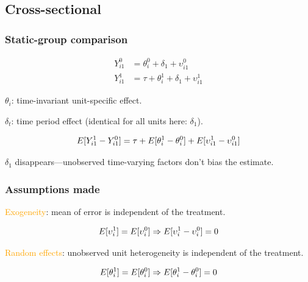 \documentclass[11pt,english,dvipsnames,aspectratio=169,handout]{beamer}\usepackage[]{graphicx}\usepackage[]{xcolor}
\begin{document}
\subsection{Cross-sectional}
\begin{frame}
  \frametitle{Static-group comparison}
  
  \begin{align*}
  Y_{i1}^0 &= \theta_{i}^0 + \delta_1 + \upsilon_{i1}^0\\
  Y_{i1}^1 &= \tau + \theta_{i}^1 + \delta_1 + \upsilon_{i1}^1
\end{align*}
  
  $\theta_i$: time-invariant unit-specific effect.
  
  $\delta_t$: time period effect (identical for all units here: $\delta_1$).
  \pause
  
  \begin{equation}
    \centering
    E[Y_{i1}^1 - Y_{i1}^0] = \tau + E[\theta_{i}^1 - \theta_{i}^0] + E[\upsilon_{i1}^1 - \upsilon_{i1}^0]
  \end{equation}
  
  $\delta_1$ disappears---unobserved time-varying factors don't bias the estimate.
  
\end{frame}


\begin{frame}
\frametitle{Assumptions made}
  \textcolor{orange}{Exogeneity}: mean of error is independent of the treatment.
  
  \begin{equation}
    \centering
    E[\upsilon_{i}^1] = E[\upsilon_{i}^0] \Rightarrow E[\upsilon_{i}^1 - \upsilon_{i}^0] = 0
  \end{equation}
  \pause
  
  \textcolor{orange}{Random effects}: unobserved unit heterogeneity is independent of the treatment.

  \begin{equation}
    \centering
    E[\theta_{i}^1] = E[\theta_{i}^0] \Rightarrow E[\theta_{i}^1 - \theta_{i}^0] = 0
  \end{equation}
\end{frame}
\end{document}
